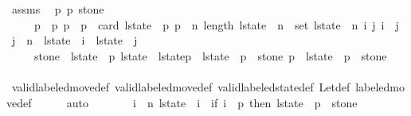 \begin{isabellebody}
\ assms\ \isamarkupfalse%
\ p{}\ p{}\ stone\ \ \isanewline
\ \ \ \ {\isacharasterisk}{\isacharasterisk}{\isacharcolon}\ {\isachardoublequoteopen}p{}\ {\isacharless}\ p{}{\isachardoublequoteclose}\ {\isachardoublequoteopen}p{}\ {\isasymle}\ p{}\ {\isacharplus}\ card\ {\isacharparenleft}l{\isacharunderscore}state\ {\isacharbang}\ p{}{\isacharparenright}{\isachardoublequoteclose}\ {\isachardoublequoteopen}p{}\ {\isasymle}\ n{\isachardoublequoteclose}\ {\isachardoublequoteopen}length\ l{\isacharunderscore}state\ {\isacharequal}\ n{\isacharplus}{}{\isachardoublequoteclose}\ {\isachardoublequoteopen}{\isasymUnion}\ {\isacharparenleft}set\ l{\isacharunderscore}state{\isacharparenright}\ {\isacharequal}\ {\isacharbraceleft}{}{\isachardot}{\isachardot}{\isacharless}n{\isacharbraceright}{\isachardoublequoteclose}\ {\isachardoublequoteopen}{\isasymforall}i\ j{\isachardot}\ i\ {\isacharless}\ j\ {\isasymand}\ j\ {\isasymle}\ n\ {\isasymlongrightarrow}\ l{\isacharunderscore}state\ {\isacharbang}\ i\ {\isasyminter}\ l{\isacharunderscore}state\ {\isacharbang}\ j\ {\isacharequal}\ {\isacharbraceleft}{\isacharbraceright}{\isachardoublequoteclose}\isanewline
\ \ \ \ \ {\isachardoublequoteopen}stone\ {\isasymin}\ l{\isacharunderscore}state\ {\isacharbang}\ p{}{\isachardoublequoteclose}\ {\isachardoublequoteopen}l{\isacharunderscore}state{\isacharprime}\ {\isacharequal}\ l{\isacharunderscore}state{\isacharbrackleft}p{}\ {\isacharcolon}{\isacharequal}\ l{\isacharunderscore}state\ {\isacharbang}\ p{}\ {\isacharminus}\ {\isacharbraceleft}stone{\isacharbraceright}{\isacharcomma}\ p{}\ {\isacharcolon}{\isacharequal}\ l{\isacharunderscore}state\ {\isacharbang}\ p{}\ {\isasymunion}\ {\isacharbraceleft}stone{\isacharbraceright}{\isacharbrackright}{\isachardoublequoteclose}\isanewline
\ \ \ \ \isamarkupfalse%
\ valid{\isacharunderscore}labeled{\isacharunderscore}move{\isacharunderscore}def\ valid{\isacharunderscore}labeled{\isacharunderscore}move{\isacharprime}{\isacharunderscore}def\ valid{\isacharunderscore}labeled{\isacharunderscore}state{\isacharunderscore}def\ Let{\isacharunderscore}def\ labeled{\isacharunderscore}move{\isacharunderscore}def\isanewline
\ \ \ \ \isamarkupfalse%
\ auto\isanewline
\isanewline
\ \ \isamarkupfalse%
\ \isamarkupfalse%
\ {\isacharasterisk}{\isacharcolon}\ {\isachardoublequoteopen}{\isasymforall}\ i\ {\isasymle}\ n{\isachardot}\ l{\isacharunderscore}state{\isacharprime}\ {\isacharbang}\ i\ {\isacharequal}\ {\isacharparenleft}if\ i\ {\isacharequal}\ p{}\ then\ l{\isacharunderscore}state\ {\isacharbang}\ p{}\ {\isacharminus}\ {\isacharbraceleft}stone{\isacharbraceright}\ \isanewline

\end{isabellebody}
